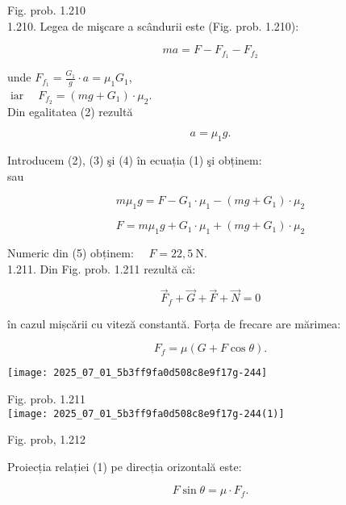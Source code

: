 Fig. prob. 1.210\\
1.210. Legea de mişcare a scândurii este (Fig. prob. 1.210):


\begin{equation*}
m a=F-F_{f_{1}}-F_{f_{2}} \tag{1}
\end{equation*}


unde $F_{f_{1}}=\frac{G_{1}}{g} \cdot a=\mu_{1} G_{1}$,\\
$\operatorname{iar} \quad F_{f_{2}}=\left(m g+G_{1}\right) \cdot \mu_{2}$.\\
Din egalitatea (2) rezultă


\begin{equation*}
a=\mu_{1} g . \tag{4}
\end{equation*}


Introducem (2), (3) şi (4) în ecuația (1) şi obținem:\\
sau

$$
m \mu_{1} g=F-G_{1} \cdot \mu_{1}-\left(m g+G_{1}\right) \cdot \mu_{2}
$$


\begin{equation*}
F=m \mu_{1} g+G_{1} \cdot \mu_{1}+\left(m g+G_{1}\right) \cdot \mu_{2} \tag{5}
\end{equation*}


Numeric din (5) obținem: $\quad F=22,5 \mathrm{~N}$.\\
1.211. Din Fig. prob. 1.211 rezultă că:


\begin{equation*}
\vec{F}_{f}+\vec{G}+\vec{F}+\vec{N}=0 \tag{1}
\end{equation*}


în cazul mișcării cu viteză constantă. Forța de frecare are mărimea:


\begin{equation*}
F_{f}=\mu(G+F \cos \theta) . \tag{2}
\end{equation*}


\begin{center}
\texttt{[image: 2025\_07\_01\_5b3ff9fa0d508c8e9f17g-244]}
\end{center}

Fig. prob. 1.211\\
\texttt{[image: 2025\_07\_01\_5b3ff9fa0d508c8e9f17g-244(1)]}

Fig. prob, 1.212

Proiecția relației (1) pe direcția orizontală este:


\begin{equation*}
F \sin \theta=\mu \cdot F_{f} . \tag{3}
\end{equation*}


